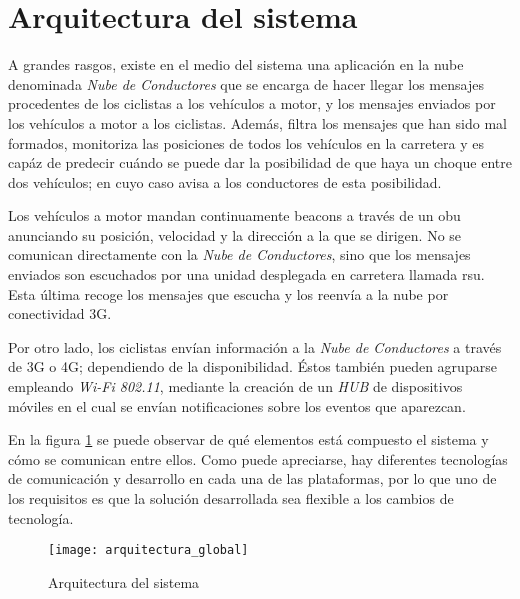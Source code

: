 \section{Arquitectura del sistema}\label{section:arquitecturaSistema}
A grandes rasgos, existe en el medio del sistema una aplicación en la nube denominada \emph{Nube de Conductores} que se encarga de hacer llegar los mensajes procedentes de los ciclistas a los vehículos a motor, y los mensajes enviados por los vehículos a motor a los ciclistas. Además, filtra los mensajes que han sido mal formados, monitoriza las posiciones de todos los vehículos en la carretera y es capáz de predecir cuándo se puede dar la posibilidad de que haya un choque entre dos vehículos; en cuyo caso avisa a los conductores de esta posibilidad.

Los vehículos a motor mandan continuamente beacons a través de un \gls{obu} anunciando su posición, velocidad y la dirección a la que se dirigen. No se comunican directamente con la \emph{Nube de Conductores}, sino que los mensajes enviados son escuchados por una unidad desplegada en carretera llamada \gls{rsu}. Esta última recoge los mensajes que escucha y los reenvía a la nube por conectividad 3G.

Por otro lado, los ciclistas envían información a la \emph{Nube de Conductores} a través de 3G o 4G; dependiendo de la disponibilidad. Éstos también pueden agruparse empleando \emph{Wi-Fi 802.11}, mediante la creación de un \emph{HUB} de dispositivos móviles en el cual se envían notificaciones sobre los eventos que aparezcan.

En la figura \ref{fig:ArquitecturaSistema} se puede observar de qué elementos está compuesto el sistema y cómo se comunican entre ellos. Como puede apreciarse, hay diferentes tecnologías de comunicación y desarrollo en cada una de las plataformas, por lo que uno de los requisitos es que la solución desarrollada sea flexible a los cambios de tecnología.

\begin{figure}[H]
	\begin{center}
		\texttt{[image: arquitectura\_global]}
		\caption{Arquitectura del sistema}
		\label{fig:ArquitecturaSistema}
	 \end{center}
\end{figure}
